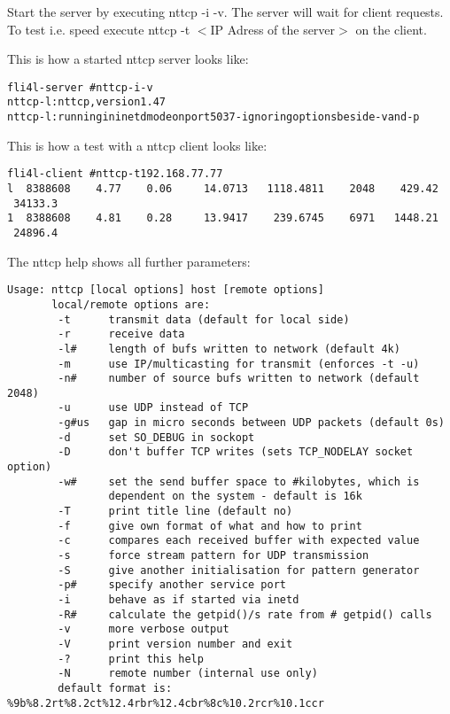 \begin{description}
    Start the server by executing nttcp -i -v. The server will wait for
    client requests. To test i.e. speed execute nttcp -t $<$IP
    Adress of the server$>$ on the client.

    This is how a started nttcp server looks like:

\begin{example}
\begin{alltt}
fli4l-server \version~\# nttcp -i -v
nttcp-l: nttcp, version 1.47
nttcp-l: running in inetd mode on port 5037 - ignoring options beside -v and -p
\end{alltt}
\end{example}

    This is how a test with a nttcp client looks like:

\begin{example}
\begin{alltt}
fli4l-client \version~\# nttcp -t 192.168.77.77
l~~8388608~~~~4.77~~~~0.06~~~~~14.0713~~~1118.4811~~~~2048~~~~429.42~~~34133.3
1~~8388608~~~~4.81~~~~0.28~~~~~13.9417~~~~239.6745~~~~6971~~~1448.21~~~24896.4
\end{alltt}
\end{example}

    The nttcp help shows all further parameters:

\begin{verbatim}
Usage: nttcp [local options] host [remote options]
       local/remote options are:
        -t      transmit data (default for local side)
        -r      receive data
        -l#     length of bufs written to network (default 4k)
        -m      use IP/multicasting for transmit (enforces -t -u)
        -n#     number of source bufs written to network (default 2048)
        -u      use UDP instead of TCP
        -g#us   gap in micro seconds between UDP packets (default 0s)
        -d      set SO_DEBUG in sockopt
        -D      don't buffer TCP writes (sets TCP_NODELAY socket option)
        -w#     set the send buffer space to #kilobytes, which is
                dependent on the system - default is 16k
        -T      print title line (default no)
        -f      give own format of what and how to print
        -c      compares each received buffer with expected value
        -s      force stream pattern for UDP transmission
        -S      give another initialisation for pattern generator
        -p#     specify another service port
        -i      behave as if started via inetd
        -R#     calculate the getpid()/s rate from # getpid() calls
        -v      more verbose output
        -V      print version number and exit
        -?      print this help
        -N      remote number (internal use only)
        default format is: %9b%8.2rt%8.2ct%12.4rbr%12.4cbr%8c%10.2rcr%10.1ccr
\end{verbatim}


\end{description}

